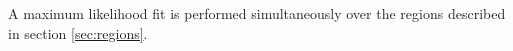 A maximum likelihood fit is performed simultaneously over the regions described in section \ref{sec:regions}.

